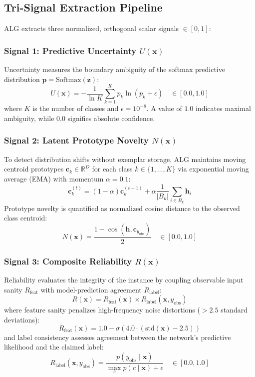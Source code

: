 \documentclass[journal,10pt,twocolumn]{article}
\begin{document}
\subsection{Tri-Signal Extraction Pipeline}
ALG extracts three normalized, orthogonal scalar signals $\in [0, 1]$:

\subsubsection{Signal 1: Predictive Uncertainty $U(\mathbf{x})$}
Uncertainty measures the boundary ambiguity of the softmax predictive distribution $\mathbf{p} = \text{Softmax}(\mathbf{z})$:
\begin{equation}
U(\mathbf{x}) = -\frac{1}{\ln K} \sum_{k=1}^K p_k \ln(p_k + \epsilon) \quad \in [0.0, 1.0]
\end{equation}
where $K$ is the number of classes and $\epsilon = 10^{-8}$. A value of $1.0$ indicates maximal ambiguity, while $0.0$ signifies absolute confidence.

\subsubsection{Signal 2: Latent Prototype Novelty $N(\mathbf{x})$}
To detect distribution shifts without exemplar storage, ALG maintains moving centroid prototypes $\mathbf{c}_k \in \mathbb{R}^D$ for each class $k \in \{1, \dots, K\}$ via exponential moving average (EMA) with momentum $\alpha = 0.1$:
\begin{equation}
\mathbf{c}_k^{(t)} = (1 - \alpha) \mathbf{c}_k^{(t-1)} + \alpha \frac{1}{|B_k|} \sum_{i \in B_k} \mathbf{h}_i
\end{equation}
Prototype novelty is quantified as normalized cosine distance to the observed class centroid:
\begin{equation}
N(\mathbf{x}) = \frac{1 - \cos(\mathbf{h}, \mathbf{c}_{y_{\text{obs}}})}{2} \quad \in [0.0, 1.0]
\end{equation}

\subsubsection{Signal 3: Composite Reliability $R(\mathbf{x})$}
Reliability evaluates the integrity of the instance by coupling observable input sanity $R_{\text{feat}}$ with model-prediction agreement $R_{\text{label}}$:
\begin{equation}
R(\mathbf{x}) = R_{\text{feat}}(\mathbf{x}) \times R_{\text{label}}(\mathbf{x}, y_{\text{obs}})
\end{equation}
where feature sanity penalizes high-frequency noise distortions ($>2.5$ standard deviations):
\begin{equation}
R_{\text{feat}}(\mathbf{x}) = 1.0 - \sigma\left(4.0 \cdot (\text{std}(\mathbf{x}) - 2.5)\right)
\end{equation}
and label consistency assesses agreement between the network's predictive likelihood and the claimed label:
\begin{equation}
R_{\text{label}}(\mathbf{x}, y_{\text{obs}}) = \frac{p(y_{\text{obs}} \mid \mathbf{x})}{\max_{c} p(c \mid \mathbf{x}) + \epsilon} \quad \in [0.0, 1.0]
\end{equation}
\end{document}

